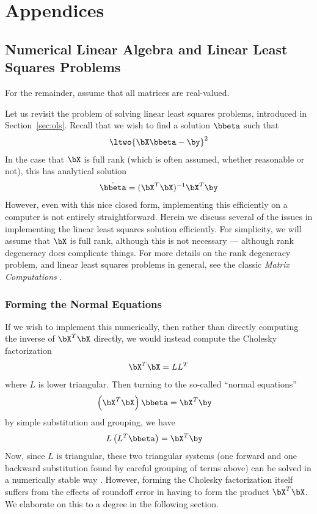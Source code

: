 \part{Appendices}

\chapter{Numerical Linear Algebra and Linear Least Squares Problems}
\label{apx:numlinalg}

For the remainder, assume that all matrices are real-valued.

Let us revisit the problem of solving linear least squares problems, introduced in Section~\ref{sec:ols}.  Recall that we wish to find a solution $\bbeta$ such that
\begin{align*}
\ltwo{ \bX\bbeta - \by }^2
\end{align*}
In the case that $\bX$ is full rank (which is often assumed, whether reasonable or not), this has analytical solution
\begin{align}
 \hat{\bbeta} = (\bX^T\bX)^{-1}\bX^T\by \label{math:ols2}
\end{align}
However, even with this nice closed form, implementing this efficiently on a computer is not entirely straightforward.  Herein we discuss several of the issues in implementing the linear least squares solution efficiently.  For simplicity, we will assume that $\bX$ is full rank, although this is not necessary --- although rank degeneracy does complicate things.  For more details on the rank degeneracy problem, and linear least squares problems in general, see the classic \emph{Matrix Computations} \citep{gvl}.




\section{Forming the Normal Equations}
\label{asec:nrmleq}
If we wish to implement this numerically, then rather than directly computing the inverse of $\bX^T\bX$ directly, we would instead compute the Cholesky factorization
\begin{align*}
\bX^T\bX = LL^T
\end{align*}
where $L$ is lower triangular.  Then turning to the so-called ``normal equations''
\begin{align}
 \left(\bX^T\bX\right)\bbeta &= \bX^T\by\label{math:normeq}
\end{align}
by simple substitution and grouping, we have
\begin{align*}
L\left(L^T\bbeta\right) &= \bX^T\by
\end{align*}
Now, since $L$ is triangular, these two triangular systems (one forward and one backward substitution found by careful grouping of terms above) can be solved in a numerically stable way \citep{numericalstab}.  However, forming the Cholesky factorization itself suffers from the effects of roundoff error in having to form the product $\bX^T\bX$.  We elaborate on this to a degree in the following section.





